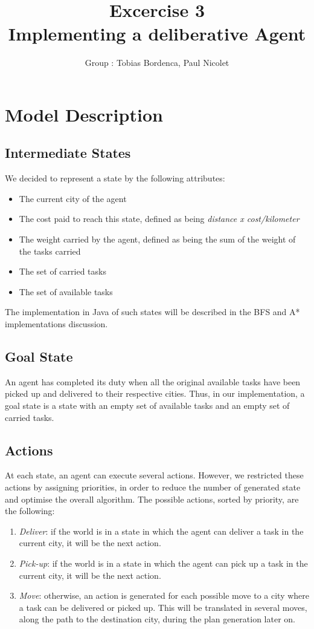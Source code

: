 \documentclass[11pt]{article}
\title{\bf Excercise 3\\ Implementing a deliberative Agent}
\author{Group \textnumero1 : Tobias Bordenca, Paul Nicolet}
\begin{document}
\maketitle

\section{Model Description}

\subsection{Intermediate States}
We decided to represent a state by the following attributes: 
\begin{itemize}
	\item The current city of the agent
	\item The cost paid to reach this state, defined as being \textit{distance x cost/kilometer}
	\item The weight carried by the agent, defined as being the sum of the weight of the tasks carried
	\item The set of carried tasks
	\item The set of available tasks
\end{itemize}

The implementation in Java of such states will be described in the BFS and A* implementations discussion.

\subsection{Goal State}
An agent has completed its duty when all the original available tasks have been picked up and delivered to their respective cities. Thus, in our implementation, a goal state is a state with an empty set of available tasks and an empty set of carried tasks. 

\subsection{Actions}
At each state, an agent can execute several actions. However, we restricted these actions by assigning priorities, in order to reduce the number of generated state and optimise the overall algorithm. The possible actions, sorted by priority, are the following:

\begin{enumerate}
	\item \textit{Deliver}: if the world is in a state in which the agent can deliver a task in the current city, it will be the next action.
	\item \textit{Pick-up}: if the world is in a state in which the agent can pick up a task in the current city, it will be the next action.
	\item \textit{Move}: otherwise, an action is generated for each possible move to a city where a task can be delivered or picked up. This will be translated in several moves, along the path to the destination city, during the plan generation later on.
\end{enumerate}
\end{document}
